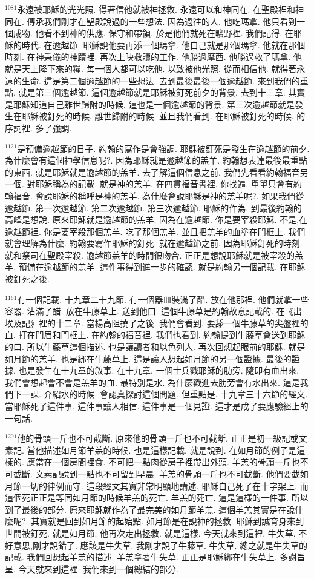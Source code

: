 \documentclass{book}
\begin{document}
$^{1081}$永遠被耶穌的光光照.
得著信他就被神拯救.
永遠可以和神同在.
在聖殿裡和神同在.
傳承我們剛才在聖殿說過的一些想法.
因為過往的人.
他吃瑪拿.
他只看到一個成物.
他看不到神的供應.
保守和帶領.
於是他們就死在曠野裡.
我們記得.
在耶穌的時代.
在逾越節.
耶穌說他要再添一個瑪拿.
他自己就是那個瑪拿.
他就在那個時刻.
在神秉儀的神蹟裡.
再次上映救贖的工作.
他勝過摩西.
他勝過救了瑪拿.
他就是天上降下來的糧.
每一個人都可以吃他.
以致被他光照.
從而相信他.
就得著永遠的生命.
這是第二個逾越節的一些想法.
去到最後最後一個逾越節.
來到我們的重點.
就是第三個逾越節.
這個逾越節就是耶穌被釘死前夕的背景.
去到十三章.
其實是耶穌知道自己離世歸附的時候.
這也是一個逾越節的背景.
第三次逾越節就是發生在耶穌被釘死的時候.
離世歸附的時候.
並且我們看到.
在耶穌被釘死的時候.
的序詞裡.
多了強調.

$^{1121}$是預備逾越節的日子.
約翰的寫作是會強調.
耶穌被釘死是發生在逾越節的前夕.
為什麼會有這個神學信息呢?.
因為耶穌就是逾越節的羔羊.
約翰想表達最後最重點的東西.
就是耶穌就是逾越節的羔羊.
去了解這個信息之前.
我們先看看約翰福音另一個.
對耶穌稱為的記載.
就是神的羔羊.
在四貫福音書裡.
你找遍.
單單只會有約翰福音.
會說耶穌的稱呼是神的羔羊.
為什麼會說耶穌是神的羔羊呢?.
如果我們從逾越節.
第一次逾越節.
第二次逾越節.
第三次逾越節.
耶穌的作為.
到最後約翰的高峰是想說.
原來耶穌就是逾越節的羔羊.
因為在逾越節.
你是要宰殺耶穌.
不是,在逾越節裡.
你是要宰殺那個羔羊.
吃了那個羔羊.
並且把羔羊的血塗在門框上.
我們就會理解為什麼.
約翰要寫作耶穌的釘死.
就在逾越節之前.
因為耶穌釘死的時刻.
就和祭司在聖殿宰殺.
逾越節羔羊的時間很吻合.
正正是想說耶穌就是被宰殺的羔羊.
預備在逾越節的羔羊.
這件事得到進一步的確認.
就是約翰另一個記載.
在耶穌被釘死之後.

$^{1161}$有一個記載.
十九章二十九節.
有一個器皿裝滿了醋.
放在他那裡.
他們就拿一些容器.
沾滿了醋.
放在牛藤草上.
送到他口.
這個牛藤草是約翰故意記載的.
在《出埃及記》裡的十二章.
當楊高阻撓了之後.
我們會看到.
要舔一個牛藤草的尖盤裡的血.
打在門眉和門框上.
在約翰的福音裡.
我們也看到.
約翰提到牛藤草會送到耶穌的口.
所以牛藤草這個描述.
也是讓讀者和以色列人.
再次回想起眼前的耶穌.
就是如月節的羔羊.
也是綁在牛藤草上.
這是讓人想起如月節的另一個證據.
最後的證據.
也是發生在十九章的敘事.
在十九章.
一個士兵戳耶穌的肋旁.
隨即有血出來.
我們會想起會不會是羔羊的血.
最特別是水.
為什麼戳進去肋旁會有水出來.
這是我們下一課.
介紹水的時候.
會認真探討這個問題.
但重點是.
十九章三十六節的經文.
當耶穌死了這件事.
這件事讓人相信.
這件事是一個見證.
這才是成了要應驗經上的一句話.

$^{1201}$他的骨頭一斤也不可截斷.
原來他的骨頭一斤也不可截斷.
正正是初一級記或文素記.
當他描述如月節羊羔的時候.
也是這樣記載.
就是說到.
在如月節的例子是這樣的.
應當在一個房間裡食.
不可把一點肉從房子裡帶出外頭.
羊羔的骨頭一斤也不可截斷.
文素記說到一點也不可留到早晨.
羊羔的骨頭一斤也不可截斷.
他們要截如月節一切的律例而守.
這段經文其實非常明顯地講述.
耶穌自己死了在十字架上.
而這個死正正是等同如月節的時候羊羔的死亡.
羊羔的死亡.
這是這樣的一件事.
所以到了最後的部分.
原來耶穌就作為了最完美的如月節羊羔.
這個羊羔其實是在說什麼呢?.
其實就是回到如月節的起始點.
如月節是在說神的拯救.
耶穌到誠育身來到世間被釘死.
就是如月節.
他再次走出拯救.
就是這樣.
今天就來到這裡.
牛失草.
不好意思,剛才說錯了.
應該是牛失草.
我剛才說了牛藤草.
牛失草.
總之就是牛失草的記載.
我們回想起羊羔的描述.
羊羔拿著牛失草.
正正是耶穌綁在牛失草上.
多謝旨呈.
今天就來到這裡.
我們來到一個總結的部分.
\end{document}
